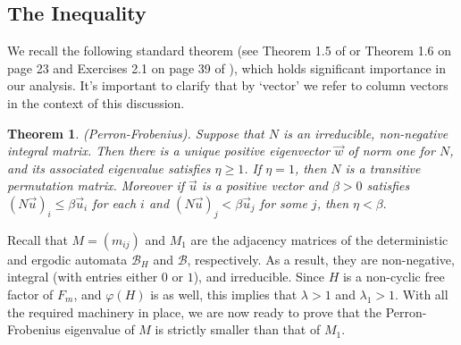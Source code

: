\documentclass{article}
\newtheorem{mythm}{Theorem}[section]
\newcommand{\B}{\mathcal{B}}
\begin{document}
    \subsection{The Inequality}
    We recall the following standard theorem (see Theorem 1.5 of \cite{bestvina1992train} or Theorem 1.6 on page 23 and Exercises 2.1 on page 39 of \cite{seneta2006non}), which holds significant importance in our analysis. It's important to clarify that by `vector' we refer to column vectors in the context of this discussion.
    \begin{mythm}\label{thm:Perron-Frobenius} (Perron-Frobenius). Suppose that $N$ is an irreducible, non-negative integral matrix. Then there is a unique positive eigenvector $\overrightarrow{w}$ of norm one for $N$, and its associated eigenvalue satisfies $\eta \geq 1$. If $\eta = 1$, then $N$ is a transitive permutation matrix. Moreover if $\overrightarrow{u}$ is a positive vector and $\beta > 0$ satisfies 
    $(N\overrightarrow{u})_i \leq \beta\overrightarrow{u}_i$ for each $i$ and 
    $(N\overrightarrow{u})_j < \beta\overrightarrow{u}_j$ for some $j$, then $\eta < \beta.$
    \end{mythm}
    
    Recall that $M = (m_{ij})$ and $M_1$ are the adjacency matrices of the deterministic and ergodic automata $\B_H$ and $\B$, respectively.  As a result, they are non-negative, integral (with entries either $0$ or $1$), and irreducible. Since $H$ is a non-cyclic free factor of $F_m$, and $\varphi(H)$ is as well, this implies that $\lambda > 1$ and $\lambda_1 > 1$. With all the required machinery in place, we are now ready to prove that the Perron-Frobenius eigenvalue of $M$ is strictly smaller than that of $M_1$.
\end{document}
